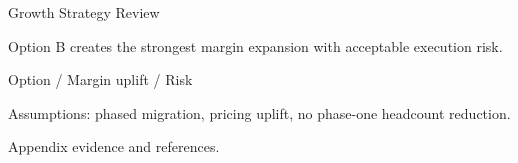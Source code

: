 \documentclass{article}
\begin{document}
\begin{RhoeArtifact}[id={growth-review}, title={Growth Strategy Review}, carrier={stageFrame}, genre={executiveDecision}, compositionGrammar={executive/default}]
\begin{RhoeFrontMatter}
\begin{RhoeFrameSet}[id={opening}]
\begin{RhoeFrame}[id={opening-1}, shellRole={coverOpener}]
\begin{RhoeZone}[role={main}]
Growth Strategy Review
\end{RhoeZone}
\end{RhoeFrame}
\end{RhoeFrameSet}
\end{RhoeFrontMatter}
\begin{RhoeMainMatter}
\begin{RhoeFrameSection}[title={Decision}]
\begin{RhoeFrameSet}[id={core}]
\begin{RhoeFrame}[id={decision-1}, shellRole={comparisonOption}, shell={option-comparison}, continuation={continued}]
\begin{RhoeZone}[role={header}]
Option B creates the strongest margin expansion with acceptable execution risk.
\end{RhoeZone}
\begin{RhoeZone}[role={main}]
\begin{RhoeTable}[id={decision-table}]
Option / Margin uplift / Risk
\end{RhoeTable}
\end{RhoeZone}
\begin{RhoeZone}[role={aside}]
Assumptions: phased migration, pricing uplift, no phase-one headcount reduction.
\end{RhoeZone}
\end{RhoeFrame}
\end{RhoeFrameSet}
\end{RhoeFrameSection}
\end{RhoeMainMatter}
\begin{RhoeBackMatter}
\begin{RhoeAppendixFrameSet}[id={appendix}]
\begin{RhoeFrame}[id={appendix-1}, shellRole={appendixSupport}]
\begin{RhoeZone}[role={main}]
Appendix evidence and references.
\end{RhoeZone}
\end{RhoeFrame}
\end{RhoeAppendixFrameSet}
\end{RhoeBackMatter}
\end{RhoeArtifact}
\end{document}
